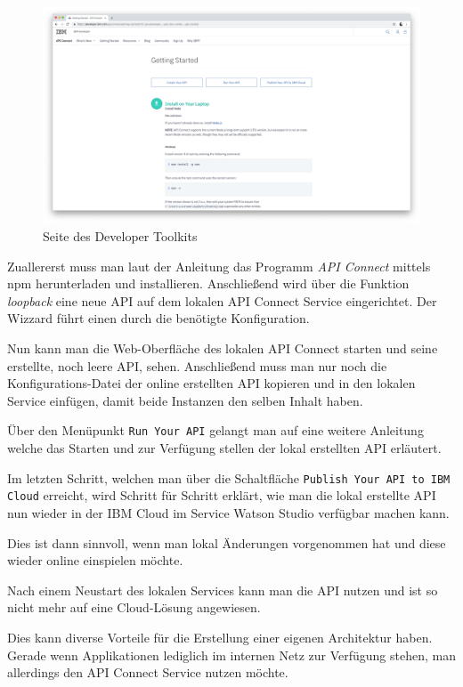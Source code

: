 \begin{figure}[h]
    \centering
    \includegraphics[width=\textwidth]{images/kapitel_3/developer_toolkit.png}
    \caption{Seite des Developer Toolkits}
    \label{fig:umsetzung_developer_toolkit}
\end{figure}

Zuallererst muss man laut der Anleitung das Programm \textit{API Connect} mittels npm herunterladen und installieren.
Anschließend wird über die Funktion \textit{loopback} eine neue API auf dem lokalen API Connect Service eingerichtet.
Der Wizzard führt einen durch die benötigte Konfiguration.

Nun kann man die Web-Oberfläche des lokalen API Connect starten und seine erstellte, noch leere API, sehen. Anschließend
muss man nur noch die Konfigurations-Datei der online erstellten API kopieren und in den lokalen Service einfügen, damit
beide Instanzen den selben Inhalt haben.

Über den Menüpunkt \texttt{Run Your API} gelangt man auf eine weitere Anleitung welche das Starten und zur Verfügung
stellen der lokal erstellten API erläutert.

Im letzten Schritt, welchen man über die Schaltfläche \texttt{Publish Your API to IBM Cloud} erreicht, wird Schritt für
Schritt erklärt, wie man die lokal erstellte API nun wieder in der IBM Cloud im Service Watson Studio verfügbar machen
kann.

Dies ist dann sinnvoll, wenn man lokal Änderungen vorgenommen hat und diese wieder online einspielen möchte.

Nach einem Neustart des lokalen Services kann man die API nutzen und ist so nicht mehr auf eine Cloud-Lösung angewiesen.

Dies kann diverse Vorteile für die Erstellung einer eigenen Architektur haben. Gerade wenn Applikationen lediglich im
internen Netz zur Verfügung stehen, man allerdings den API Connect Service nutzen möchte.

